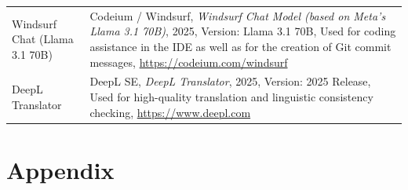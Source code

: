 \documentclass[12pt,a4paper]{article}
\begin{document}
\begin{table}[H]
\begin{threeparttable}
\begin{tabular}{p{4cm} p{12cm}}
			Windsurf Chat (Llama 3.1 70B) &
			Codeium / Windsurf, \textit{Windsurf Chat Model (based on Meta’s Llama 3.1 70B)}, 2025, Version: Llama 3.1 70B, Used for coding assistance in the IDE as well as for the creation of Git commit messages, \url{https://codeium.com/windsurf}                                                                                                                                                                                                                       \\

			DeepL Translator              &
			DeepL SE, \textit{DeepL Translator}, 2025, Version: 2025 Release, Used for high-quality translation and linguistic consistency checking, \url{https://www.deepl.com}                                                                                                                                                                                                                                                                                               \\
			\bottomrule
		\end{tabular}
	\end{threeparttable}
\end{table}

\newpage
\section{Appendix}
\label{sec:appendix}

\newpage
\end{document}
